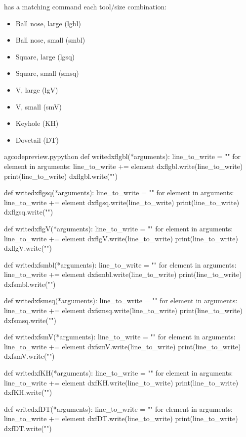 \documentclass{ltxdoc}
\begin{document}
\noindent has a matching command each tool/size combination:

\begin{itemize}
\item Ball nose, large (lgbl) 
\item Ball nose, small (smbl) 
\item Square, large (lgsq) 
\item Square, small (smsq) 
\item V, large (lgV) 
\item V, small (smV) 
\item Keyhole (KH) 
\item Dovetail (DT) 
\end{itemize}
 
\lstset{firstnumber=\thegcpy}
\begin{writecode}{a}{gcodepreview.py}{python}
def writedxflgbl(*arguments):
    line_to_write = ""
    for element in arguments:
        line_to_write += element
    dxflgbl.write(line_to_write)
    print(line_to_write)
    dxflgbl.write("\n")

def writedxflgsq(*arguments):
    line_to_write = ""
    for element in arguments:
        line_to_write += element
    dxflgsq.write(line_to_write)
    print(line_to_write)
    dxflgsq.write("\n")

def writedxflgV(*arguments):
    line_to_write = ""
    for element in arguments:
        line_to_write += element
    dxflgV.write(line_to_write)
    print(line_to_write)
    dxflgV.write("\n")

def writedxfsmbl(*arguments):
    line_to_write = ""
    for element in arguments:
        line_to_write += element
    dxfsmbl.write(line_to_write)
    print(line_to_write)
    dxfsmbl.write("\n")

def writedxfsmsq(*arguments):
    line_to_write = ""
    for element in arguments:
        line_to_write += element
    dxfsmsq.write(line_to_write)
    print(line_to_write)
    dxfsmsq.write("\n")

def writedxfsmV(*arguments):
    line_to_write = ""
    for element in arguments:
        line_to_write += element
    dxfsmV.write(line_to_write)
    print(line_to_write)
    dxfsmV.write("\n")

def writedxfKH(*arguments):
    line_to_write = ""
    for element in arguments:
        line_to_write += element
    dxfKH.write(line_to_write)
    print(line_to_write)
    dxfKH.write("\n")

def writedxfDT(*arguments):
    line_to_write = ""
    for element in arguments:
        line_to_write += element
    dxfDT.write(line_to_write)
    print(line_to_write)
    dxfDT.write("\n")

\end{writecode}
\addtocounter{gcpy}{64}
%
 
\end{document}
